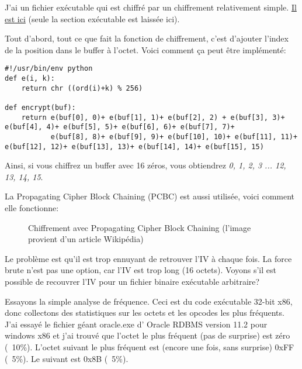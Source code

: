 
J'ai un fichier exécutable qui est chiffré par un chiffrement relativement simple.
\href{\RepoURL/examples/simple_exec_crypto/files/cipher.bin}{Il est ici}
(seule la section exécutable est laissée ici).

Tout d'abord, tout ce que fait la fonction de chiffrement, c'est d'ajouter l'index
de la position dans le buffer à l'octet.
Voici comment ça peut être implémenté:

\begin{lstlisting}[caption=Python script,style=custompy]
#!/usr/bin/env python
def e(i, k):
    return chr ((ord(i)+k) % 256)

def encrypt(buf):
    return e(buf[0], 0)+ e(buf[1], 1)+ e(buf[2], 2) + e(buf[3], 3)+ e(buf[4], 4)+ e(buf[5], 5)+ e(buf[6], 6)+ e(buf[7], 7)+
           e(buf[8], 8)+ e(buf[9], 9)+ e(buf[10], 10)+ e(buf[11], 11)+ e(buf[12], 12)+ e(buf[13], 13)+ e(buf[14], 14)+ e(buf[15], 15)
\end{lstlisting}

Ainsi, si vous chiffrez un buffer avec 16 zéros, vous obtiendrez \emph{0, 1, 2, 3 ... 12, 13, 14, 15}.

La Propagating Cipher Block Chaining (PCBC) est aussi utilisée, voici comment elle
fonctionne:

\begin{figure}[H]
\centering
{}
\caption{Chiffrement avec Propagating Cipher Block Chaining (l'image provient d'un article Wikipédia)}
\end{figure}

Le problème est qu'il est trop ennuyant de retrouver l'\ac{IV} à chaque fois.
La force brute n'est pas une option, car l'\ac{IV} est trop long (16 octets).
Voyons s'il est possible de recouvrer l'\ac{IV} pour un fichier binaire exécutable arbitraire?

Essayons la simple analyse de fréquence.
Ceci est du code exécutable 32-bit x86, donc collectons des statistiques sur les
octets et les opcodes les plus fréquents.
J'ai essayé le fichier géant oracle.exe d' Oracle RDBMS version 11.2 pour windows
x86 et j'ai trouvé que l'octet le plus fréquent (pas de surprise) est zéro (~10\%).
L'octet suivant le plus fréquent est (encore une fois, sans surprise) 0xFF (~5\%).
Le suivant est 0x8B (~5\%).

